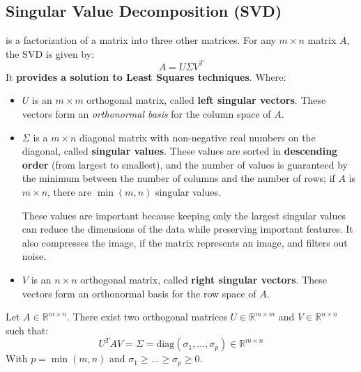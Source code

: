 \subsection{Singular Value Decomposition (SVD)}

 is a factorization of a matrix into three other matrices. For any $m \times n$ matrix $A$, the SVD is given by:
\begin{equation}\label{eq: singular value decomposition}
    A = U \Sigma V^{T}
\end{equation}
It \textbf{provides a solution to Least Squares techniques}. Where:
\begin{itemize}
    \item $U$ is an $m \times m$ orthogonal matrix, called \textbf{left singular vectors}. These vectors form an \emph{orthonormal basis} for the column space of $A$.

    \item $\Sigma$ is a $m \times n$ diagonal matrix with non-negative real numbers on the diagonal, called \textbf{singular values}. These values are sorted in \textbf{descending order} (from largest to smallest), and the number of values is guaranteed by the minimum between the number of columns and the number of rows; if $A$ is $m \times n$, there are $\min\left(m,n\right)$ singular values.
    
    These values are important because keeping only the largest singular values can reduce the dimensions of the data while preserving important features. It also compresses the image, if the matrix represents an image, and filters out noise.

    \item $V$ is an $n \times n$ orthogonal matrix, called \textbf{right singular vectors}. These vectors form an orthonormal basis for the row space of $A$.
\end{itemize}

\begin{theorem}
    Let $A \in \mathbb{R}^{m \times n}$. There exist two orthogonal matrices $U \in \mathbb{R}^{m \times m}$ and $V \in \mathbb{R}^{n \times n}$ such that:
    \begin{equation}\label{eq: SVD theorem}
        U^{T} A V = \Sigma = \mathrm{diag}\left(\sigma_{1}, \dots, \sigma_{p}\right) \in \mathbb{R}^{m \times n}
    \end{equation}
    With $p = \min\left(m, n\right)$ and $\sigma_{1} \ge \dots \ge \sigma_{p} \ge 0$.
\end{theorem}

